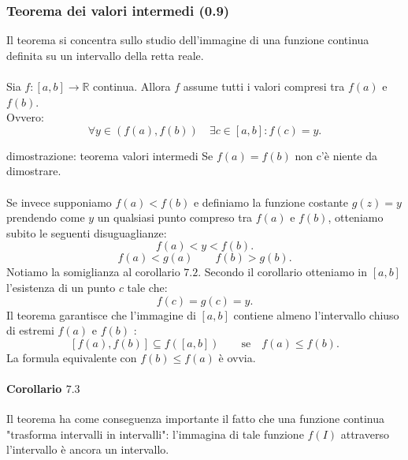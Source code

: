 \documentclass[x11names]{article}
\begin{document}
\subsubsection{Teorema dei valori intermedi (0.9)}
Il teorema si concentra sullo studio dell'immagine di una funzione continua definita su un intervallo  della retta reale.
\\ \\
Sia $f:\left[a,b\right] \rightarrow \mathbb{R}$ continua. Allora $f$ assume tutti i valori compresi tra $f\left(a\right)$ e $f\left(b\right)$.
\\
Ovvero:
\[
	\forall y \in \left(f\left(a\right),f\left(b\right)\right) \quad \exists c \in \left[a,b\right] : f\left(c\right) = y
.\] 


\begin{center}

\end{center}

\begin{es}{dimostrazione: teorema valori intermedi}
Se $f\left(a\right) = f\left(b\right)$ non c'è niente da dimostrare.
\\ \\
Se invece supponiamo $f\left(a\right) < f\left(b\right)$ e definiamo la funzione costante $g\left(z\right) = y$ prendendo come $y$ un qualsiasi punto compreso tra $f\left(a\right)$ e $f\left(b\right)$, otteniamo subito le seguenti disuguaglianze:
\[
f\left(a\right) < y < f\left(b\right)
.\] 
\[
f\left(a\right) < g\left(a\right) \qquad f\left(b\right) > g\left(b\right)
.\] 
Notiamo la somiglianza al corollario $7.2$. Secondo il corollario otteniamo in  $\left[a,b\right]$ l'esistenza di un punto $c$ tale che:
\[
f\left(c\right) = g\left(c\right) = y
.\] 
Il teorema garantisce che l'immagine di $\left[a,b\right]$ contiene almeno l'intervallo chiuso di estremi $f\left(a\right)$ e $f\left(b\right)$ :
\[
	\left[f\left(a\right),f\left(b\right)\right] \subseteq f\left(\left[a,b\right]\right) \qquad \text{se} \quad f\left(a\right) \leq f\left(b\right)
.\] 
La formula equivalente con $f\left(b\right) \leq f\left(a\right)$ è ovvia.
\end{es}

\paragraph{Corollario $7.3$}
Il teorema ha come conseguenza importante il fatto che una funzione continua "trasforma intervalli in intervalli": l'immagina di tale funzione $f\left(I\right)$ attraverso l'intervallo è ancora un intervallo.
\end{document}
